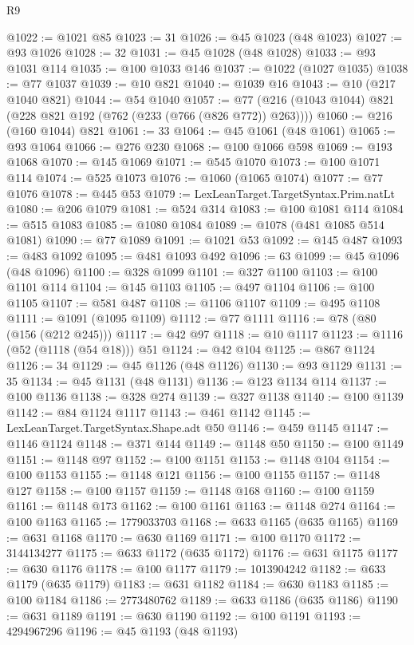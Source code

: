 \begin{lexlean}{R9}
\begin{coremodule}
@1022 := @1021 @85
@1023 := 31
@1026 := @45 @1023 (@48 @1023)
@1027 := @93 @1026
@1028 := 32
@1031 := @45 @1028 (@48 @1028)
@1033 := @93 @1031 @114
@1035 := @100 @1033 @146
@1037 := @1022 (@1027 @1035)
@1038 := @77 @1037
@1039 := @10 @821
@1040 := @1039 @16
@1043 := @10 (@217 @1040 @821)
@1044 := @54 @1040
@1057 := @77 (@216 (@1043 @1044) @821 (@228 @821 @192 (@762 (@233 (@766 (@826 @772)) @263))))
@1060 := @216 (@160 @1044) @821
@1061 := 33
@1064 := @45 @1061 (@48 @1061)
@1065 := @93 @1064
@1066 := @276 @230
@1068 := @100 @1066 @598
@1069 := @193 @1068
@1070 := @145 @1069
@1071 := @545 @1070
@1073 := @100 @1071 @114
@1074 := @525 @1073
@1076 := @1060 (@1065 @1074)
@1077 := @77 @1076
@1078 := @445 @53
@1079 := LexLeanTarget.TargetSyntax.Prim.natLt
@1080 := @206 @1079
@1081 := @524 @314
@1083 := @100 @1081 @114
@1084 := @515 @1083
@1085 := @1080 @1084
@1089 := @1078 (@481 @1085 @514 @1081)
@1090 := @77 @1089
@1091 := @1021 @53
@1092 := @145 @487
@1093 := @483 @1092
@1095 := @481 @1093 @492
@1096 := 63
@1099 := @45 @1096 (@48 @1096)
@1100 := @328 @1099
@1101 := @327 @1100
@1103 := @100 @1101 @114
@1104 := @145 @1103
@1105 := @497 @1104
@1106 := @100 @1105
@1107 := @581 @487
@1108 := @1106 @1107
@1109 := @495 @1108
@1111 := @1091 (@1095 @1109)
@1112 := @77 @1111
@1116 := @78 (@80 (@156 (@212 @245)))
@1117 := @42 @97
@1118 := @10 @1117
@1123 := @1116 (@52 (@1118 (@54 @18))) @51
@1124 := @42 @104
@1125 := @867 @1124
@1126 := 34
@1129 := @45 @1126 (@48 @1126)
@1130 := @93 @1129
@1131 := 35
@1134 := @45 @1131 (@48 @1131)
@1136 := @123 @1134 @114
@1137 := @100 @1136
@1138 := @328 @274
@1139 := @327 @1138
@1140 := @100 @1139
@1142 := @84 @1124 @1117
@1143 := @461 @1142
@1145 := LexLeanTarget.TargetSyntax.Shape.adt @50
@1146 := @459 @1145
@1147 := @1146 @1124
@1148 := @371 @144
@1149 := @1148 @50
@1150 := @100 @1149
@1151 := @1148 @97
@1152 := @100 @1151
@1153 := @1148 @104
@1154 := @100 @1153
@1155 := @1148 @121
@1156 := @100 @1155
@1157 := @1148 @127
@1158 := @100 @1157
@1159 := @1148 @168
@1160 := @100 @1159
@1161 := @1148 @173
@1162 := @100 @1161
@1163 := @1148 @274
@1164 := @100 @1163
@1165 := 1779033703
@1168 := @633 @1165 (@635 @1165)
@1169 := @631 @1168
@1170 := @630 @1169
@1171 := @100 @1170
@1172 := 3144134277
@1175 := @633 @1172 (@635 @1172)
@1176 := @631 @1175
@1177 := @630 @1176
@1178 := @100 @1177
@1179 := 1013904242
@1182 := @633 @1179 (@635 @1179)
@1183 := @631 @1182
@1184 := @630 @1183
@1185 := @100 @1184
@1186 := 2773480762
@1189 := @633 @1186 (@635 @1186)
@1190 := @631 @1189
@1191 := @630 @1190
@1192 := @100 @1191
@1193 := 4294967296
@1196 := @45 @1193 (@48 @1193)

\end{coremodule}
\end{lexlean}

